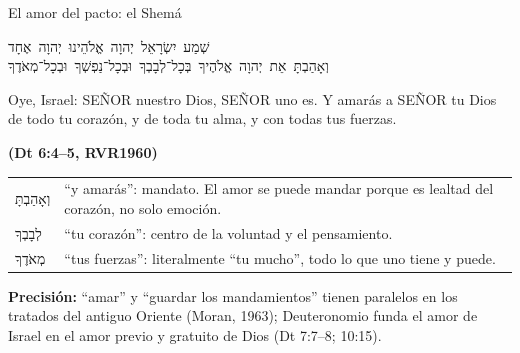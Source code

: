 \documentclass[hyperref={bookmarks=false},aspectratio=169]{beamer}
\newcommand{\heb}[1]{\mbox{\foreignlanguage{hebrew}{#1}}}
\newcommand{\SENOR}{S{\fontsize{0.78em}{1em}\selectfont EÑOR}}
\newcommand{\fuente}[1]{\par\hfill{\upshape\bfseries\footnotesize\textcolor{azul}{#1}}}
\newcommand{\precision}[1]{{\footnotesize\color{gris}\textbf{Precisión:} #1}}
\begin{document}
\begin{frame}{El amor del pacto: el Shemá}
\begin{center}\heb{שְׁמַע יִשְׂרָאֵל יְהוָה אֱלֹהֵינוּ יְהוָה אֶחָד}\\[1pt]\heb{וְאָהַבְתָּ אֵת יְהוָה אֱלֹהֶיךָ בְּכָל־לְבָבְךָ וּבְכָל־נַפְשְׁךָ וּבְכָל־מְאֹדֶךָ}\end{center}
\begin{cita}Oye, Israel: \SENOR{} nuestro Dios, \SENOR{} uno es. Y amarás a \SENOR{} tu Dios de todo tu corazón, y de toda tu alma, y con todas tus fuerzas.\fuente{(Dt 6:4--5, RVR1960)}\end{cita}
\renewcommand{\arraystretch}{1.05}\scriptsize
\begin{tabular}{@{}>{\RaggedRight\arraybackslash}p{2.3cm}>{\RaggedRight\arraybackslash}p{9.6cm}@{}}
\heb{וְאָהַבְתָּ} & ``y amarás'': mandato. El amor se puede mandar porque es lealtad del corazón, no solo emoción. \\
\heb{לְבָבְךָ} & ``tu corazón'': centro de la voluntad y el pensamiento. \\
\heb{מְאֹדֶךָ} & ``tus fuerzas'': literalmente ``tu mucho'', todo lo que uno tiene y puede. \\
\end{tabular}\par\smallskip
\precision{``amar'' y ``guardar los mandamientos'' tienen paralelos en los tratados del antiguo Oriente (Moran, 1963); Deuteronomio funda el amor de Israel en el amor previo y gratuito de Dios (Dt 7:7--8; 10:15).}
\end{frame}
\end{document}
